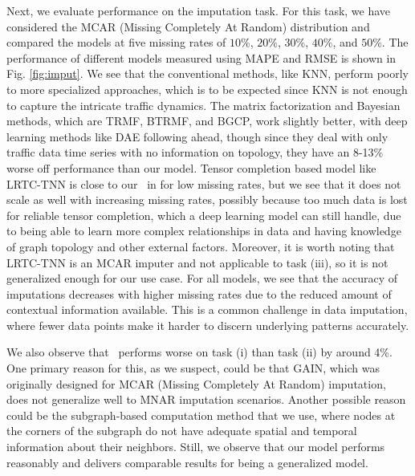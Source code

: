 Next, we evaluate performance on the imputation task. For this task, we have considered the MCAR (Missing Completely At Random) distribution and compared the models at five missing rates of $10\%$, $20\%$, $30\%$, $40\%$, and $50\%$. The performance of different models measured using MAPE and RMSE is shown in Fig. \ref{fig:imput}. We see that the conventional methods, like KNN, perform poorly to more specialized approaches, which is to be expected since KNN is not enough to capture the intricate traffic dynamics. The matrix factorization and Bayesian methods, which are TRMF, BTRMF, and BGCP, work slightly better, with deep learning methods like DAE following ahead, though since they deal with only traffic data time series with no information on topology, they have an 8-13\% worse off performance than our model. Tensor completion based model like LRTC-TNN is close to our \modelname\ in for low missing rates, but we see that it does not scale as well with increasing missing rates, possibly because too much data is lost for reliable tensor completion, which a deep learning model can still handle, due to being able to learn more complex relationships in data and having knowledge of graph topology and other external factors. Moreover, it is worth noting that LRTC-TNN is an MCAR imputer and not applicable to task (iii), so it is not generalized enough for our use case. For all models, we see that the accuracy of imputations decreases with higher missing rates due to the reduced amount of contextual information available. This is a common challenge in data imputation, where fewer data points make it harder to discern underlying patterns accurately. 

We also observe that \modelname\ performs worse on task (i) than task (ii) by around 4\%. One primary reason for this, as we suspect, could be that GAIN, which was originally designed for MCAR (Missing Completely At Random) imputation, does not generalize well to MNAR imputation scenarios. Another possible reason could be the subgraph-based computation method that we use, where nodes at the corners of the subgraph do not have adequate spatial and temporal information about their neighbors. Still, we observe that our model performs reasonably and delivers comparable results for being a generalized model.

